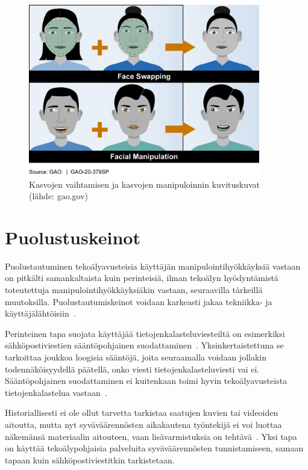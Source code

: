 \begin{otherlanguage}{finnish}
\begin{figure}[ht]  
    \centering  
    \includegraphics[width=0.9\textwidth]{images/704754.png}  
    \caption{Kasvojen vaihtamisen ja kasvojen manipuloinnin kuvituskuvat (lähde: gao.gov)}  
    \label{figure:deepfakes_fin}  
\end{figure}  

\section*{Puolustuskeinot}

Puolustautuminen tekoälyavusteisia käyttäjän manipulointihyökkäyksiä vastaan on pitkälti samankaltaista kuin perinteisiä, ilman tekoälyn hyödyntämistä toteutettuja manipulointihyökkäyksiäkin vastaan, seuraavilla tärkeillä muutoksilla. Puolustautumiskeinot voidaan karkeasti jakaa tekniikka- ja käyttäjälähtöisiin~\citep{tsinganos_Towards_Automated_Recognition_Chat_SE_Enterprise_2018}.


Perinteinen tapa suojata käyttäjää tietojenkalasteluviesteiltä on esimerkiksi sähköpostiviestien sääntöpohjainen suodattaminen~\citep{mirsky_Threat_Offensive_AI_Organizations_2023}. Yksinkertaistettuna se tarkoittaa joukkoa loogisia sääntöjä, joita seuraamalla voidaan jollakin todennäköisyydellä päätellä, onko viesti tietojenkalasteluviesti vai ei. Sääntöpohjainen suodattaminen ei kuitenkaan toimi hyvin tekoälyavusteista tietojenkalastelua vastaan~\citep{fakhouri_AI_Driven_Solutions_SE_Attacks_2024}.

Historiallisesti ei ole ollut tarvetta tarkistaa saatujen kuvien tai videoiden aitoutta, mutta nyt syväväärennösten aikakautena työntekijä ei voi luottaa näkemänsä materiaalin aitouteen, vaan lisävarmistuksia on tehtävä~\citep{mirsky_Creation_Detection_Deepfakes_2021}. Yksi tapa on käyttää tekoälypohjaisia palveluita syväväärennösten tunnistamiseen, samaan tapaan kuin sähköpostiviestitkin tarkistetaan.



\end{otherlanguage}

